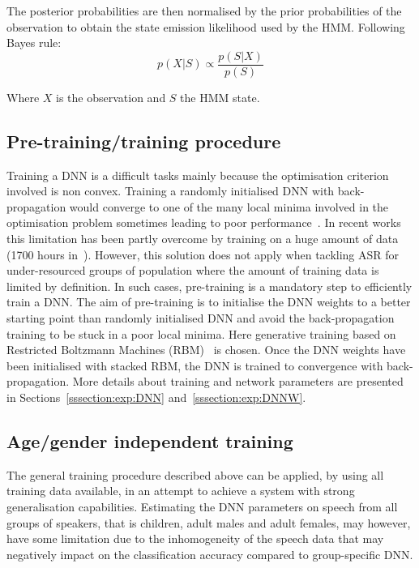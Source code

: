 \documentclass{nle}
\begin{document}
The posterior probabilities are then normalised by the prior probabilities of the observation to obtain the state emission likelihood used by the HMM. Following Bayes rule:
\begin{equation}
 p(X|S)\propto \frac{p(S|X)}{p(S)} \nonumber
\end{equation}

Where $X$ is the observation and $S$ the HMM state.

\subsection{Pre-training/training procedure}
Training a DNN is a difficult tasks mainly because the optimisation criterion involved is non convex. Training a randomly initialised DNN with back-propagation would converge to one of the many local minima involved in the optimisation problem sometimes leading to poor performance~\citep{erhan10}. In recent works this limitation has been partly overcome by training on a huge amount of data (1700 hours in~\citet{42536}). However, this solution does not apply when tackling ASR for under-resourced groups of population where the amount of training data is limited by definition. In such cases, pre-training is a mandatory step to efficiently train a DNN. The aim of pre-training is to initialise the DNN weights to a better starting point than randomly initialised DNN and avoid the back-propagation training to be stuck in a poor local minima. Here generative training based on Restricted Boltzmann Machines (RBM)~\citep{hinton06,erhan10} is chosen. Once the DNN weights have been initialised with stacked RBM, the DNN is trained to convergence with back-propagation. More details about training and network parameters are presented in Sections~\ref{sssection:exp:DNN} and~\ref{sssection:exp:DNNW}.

\subsection{Age/gender independent training} 
The general training procedure described above can be applied, by using
all training data available, in an attempt to  achieve   a  system  with   strong  generalisation  capabilities.
Estimating the DNN  parameters on speech from all  groups of speakers,
that is  children, adult  males and adult  females, may however, have
some limitation due to the  inhomogeneity of the speech data that may
negatively   impact  on  the   classification  accuracy   compared  to
group-specific DNN.
\end{document}

